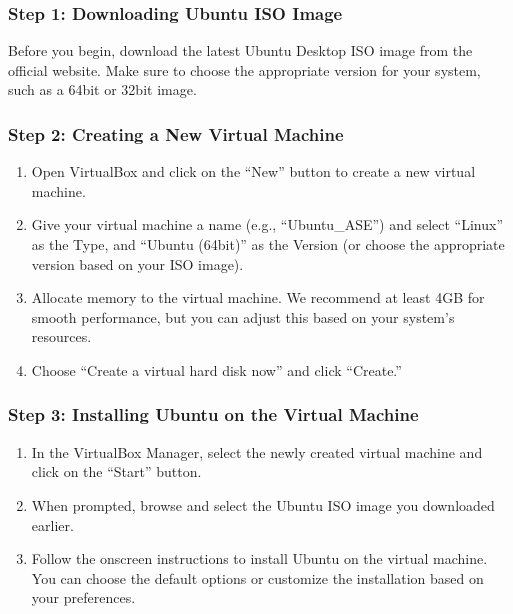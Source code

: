 \documentclass[letterpaper,10pt,english]{sphinxmanual}
\begin{document}
\subsubsection{Step 1: Downloading Ubuntu ISO Image}
\label{\detokenize{vbox/vbox:step-1-downloading-ubuntu-iso-image}}
\sphinxAtStartPar
Before you begin, download the latest Ubuntu Desktop ISO image from the official website. Make sure to choose the appropriate version for your system, such as a 64\sphinxhyphen{}bit or 32\sphinxhyphen{}bit image.

\sphinxAtStartPar
{}


\subsubsection{Step 2: Creating a New Virtual Machine}
\label{\detokenize{vbox/vbox:step-2-creating-a-new-virtual-machine}}\begin{enumerate}
%
\item {} 
\sphinxAtStartPar
Open VirtualBox and click on the “New” button to create a new virtual machine.

\item {} 
\sphinxAtStartPar
Give your virtual machine a name (e.g., “Ubuntu\_ASE”) and select “Linux” as the Type, and “Ubuntu (64\sphinxhyphen{}bit)” as the Version (or choose the appropriate version based on your ISO image).

\item {} 
\sphinxAtStartPar
Allocate memory to the virtual machine. We recommend at least 4GB for smooth performance, but you can adjust this based on your system’s resources.

\item {} 
\sphinxAtStartPar
Choose “Create a virtual hard disk now” and click “Create.”

\end{enumerate}


\subsubsection{Step 3: Installing Ubuntu on the Virtual Machine}
\label{\detokenize{vbox/vbox:step-3-installing-ubuntu-on-the-virtual-machine}}\begin{enumerate}
%
\item {} 
\sphinxAtStartPar
In the VirtualBox Manager, select the newly created virtual machine and click on the “Start” button.

\item {} 
\sphinxAtStartPar
When prompted, browse and select the Ubuntu ISO image you downloaded earlier.

\item {} 
\sphinxAtStartPar
Follow the on\sphinxhyphen{}screen instructions to install Ubuntu on the virtual machine. You can choose the default options or customize the installation based on your preferences.

\end{enumerate}
\end{document}

